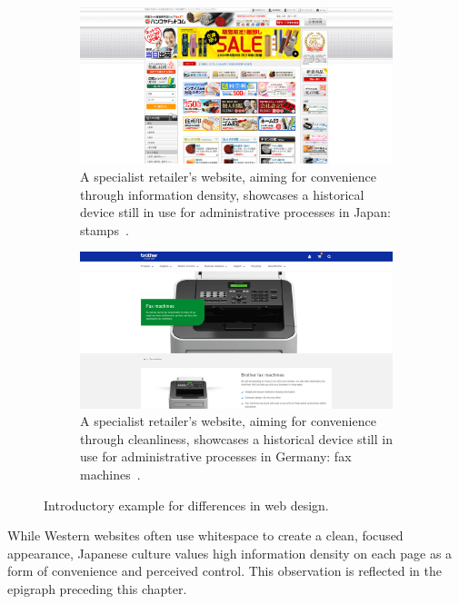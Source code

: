 \begin{figure}[H]
    \centering
    \begin{subfigure}{.45\textwidth}
      \centering
      \includegraphics[width=\linewidth]{figures/hankoya.png}
      \caption{A specialist retailer's website, aiming for convenience through information density, showcases a historical device still in use for administrative processes in Japan: stamps~\cite{Ha24}.}
      \label{fig:hanko}
    \end{subfigure}
    \hspace{0.025\textwidth}
    \begin{subfigure}{0.45\textwidth}
      \centering
      \includegraphics[width=\linewidth]{figures/brother.png}
      \caption{A specialist retailer's website, aiming for convenience through cleanliness, showcases a historical device still in use for administrative processes in Germany: fax machines~\cite{Br24}.}
      \label{fig:fax-machine}
    \end{subfigure}
    \caption{Introductory example for differences in web design.}
    \label{fig:intro-examples}
\end{figure}

While Western websites often use whitespace to create a clean, focused appearance, Japanese culture values high information density on each page as a form of convenience and perceived control.
This observation is reflected in the epigraph preceding this chapter.


